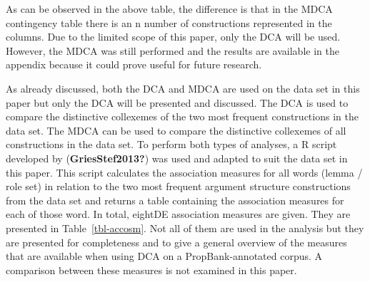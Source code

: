 \documentclass[
  letterpaper,
  DIV=11,
  numbers=noendperiod]{scrartcl}
\begin{document}
As can be observed in the above table, the difference is that in the
MDCA contingency table there is an n number of constructions represented
in the columns. Due to the limited scope of this paper, only the DCA
will be used. However, the MDCA was still performed and the results are
available in the appendix because it could prove useful for future
research.

As already discussed, both the DCA and MDCA are used on the data set in
this paper but only the DCA will be presented and discussed. The DCA is
used to compare the distinctive collexemes of the two most frequent
constructions in the data set. The MDCA can be used to compare the
distinctive collexemes of all constructions in the data set. To perform
both types of analyses, a R script developed by
(\textbf{GriesStef2013?}) was used and adapted to suit the data set in
this paper. This script calculates the association measures for all
words (lemma / role set) in relation to the two most frequent argument
structure constructions from the data set and returns a table containing
the association measures for each of those word. In total, eightDE
association measures are given. They are presented in
Table~\ref{tbl-accosm}. Not all of them are used in the analysis but
they are presented for completeness and to give a general overview of
the measures that are available when using DCA on a PropBank-annotated
corpus. A comparison between these measures is not examined in this
paper.
\end{document}
